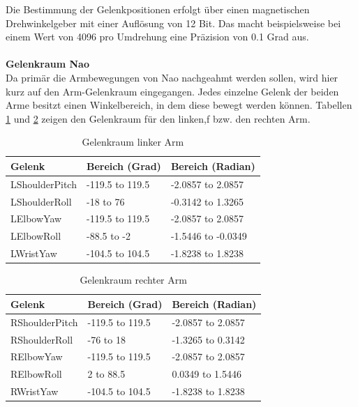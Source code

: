 Die Bestimmung der Gelenkpositionen erfolgt über einen magnetischen Drehwinkelgeber	mit einer Auflösung von 12 Bit. Das macht beispielsweise bei einem Wert von 4096 pro Umdrehung eine Präzision von 0.1 Grad aus.
\\
\\
\textbf{Gelenkraum Nao}
\\
Da primär die Armbewegungen von Nao nachgeahmt werden sollen, wird hier kurz auf den Arm-Gelenkraum eingegangen. Jedes einzelne Gelenk der beiden Arme besitzt einen Winkelbereich, in dem diese bewegt werden können. Tabellen \ref{tab:Lgelenkraum} und \ref{tab:Rgelenkraum} zeigen den Gelenkraum für den linken,f bzw. den rechten Arm.
\\

\begin{table}[H]
 \centering 
    \begin{tabular}{|l|l|l|}
    \hline
    \textbf{Gelenk}         & \textbf{Bereich (Grad) } & \textbf{Bereich (Radian)}   \\
    \hline
    LShoulderPitch & -119.5 to 119.5 & -2.0857 to 2.0857  \\
    LShoulderRoll  & -18 to 76       & -0.3142 to 1.3265  \\
    LElbowYaw      & -119.5 to 119.5 & -2.0857 to 2.0857  \\
    LElbowRoll     & -88.5 to -2     & -1.5446 to -0.0349 \\
    LWristYaw      & -104.5 to 104.5 & -1.8238 to 1.8238  \\ \hline
    \end{tabular}
    \caption {Gelenkraum linker Arm}
    \label{tab:Lgelenkraum}
\end{table}
\begin{table}[H]
 \centering 
    \begin{tabular}{|l|l|l|}
    \hline
    \textbf{Gelenk}         & \textbf{Bereich (Grad) } & \textbf{Bereich (Radian)}   \\
    \hline
    RShoulderPitch & -119.5 to 119.5 & -2.0857 to 2.0857 \\
    RShoulderRoll  & -76 to 18       & -1.3265 to 0.3142 \\
    RElbowYaw      & -119.5 to 119.5 & -2.0857 to 2.0857 \\
    RElbowRoll     & 2 to 88.5       & 0.0349 to 1.5446  \\
    RWristYaw      & -104.5 to 104.5 & -1.8238 to 1.8238 \\ \hline
    \end{tabular}
    \caption {Gelenkraum rechter Arm}
    \label{tab:Rgelenkraum}
\end{table}
